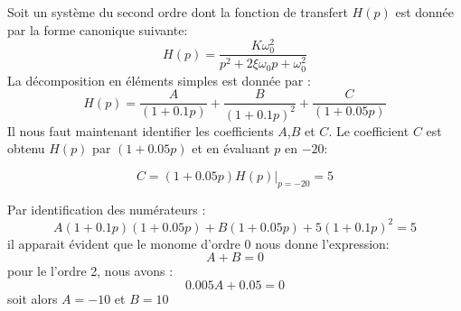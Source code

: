 Soit un système du second ordre dont la fonction de transfert $H(p)$ est donnée
par la forme canonique suivante:
\[
H(p)=\dfrac{K\omega_0^2}{p^2+2\xi\omega_0p+\omega_0^2}
\]
La décomposition en éléments simples est donnée par :
\[
H(p)=\dfrac{A}{(1+0.1p)}+\dfrac{B}{(1+0.1p)^2}+\dfrac{C}{(1+0.05p)}
\]
Il nous faut maintenant identifier les coefficients $A$,$B$ et $C$.
Le coefficient $C$ est obtenu $H(p)$ par $(1+0.05p)$ et en évaluant $p$ en $-20$:

\[
C=(1+0.05p)H(p)\Big|_{p=-20}=5
\]

Par identification des numérateurs :
\[
A(1+0.1p)(1+0.05p)+B(1+0.05p)+5(1+0.1p)^2=5
\]
il apparait évident que le monome d'ordre 0 nous donne l'expression:
\[
A+B=0
\]
pour le l'ordre 2, nous avons :
\[
0.005A+0.05=0
\]
soit alors $A=-10$ et $B=10$

